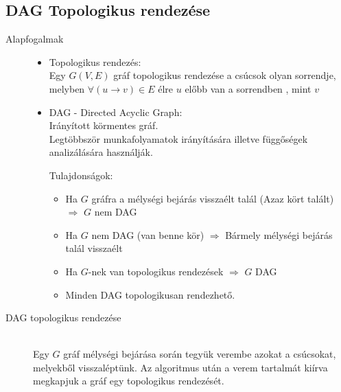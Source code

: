 \documentclass[margin=0px]{article}
\begin{document}
\subsection{DAG Topologikus rendezése}
\begin{description}
    \item[Alapfogalmak] \hfill
        \begin{itemize}
            \item Topologikus rendezés: \\
                  Egy $G(V,E)$ gráf topologikus rendezése a csúcsok olyan sorrendje, melyben $\forall (u\rightarrow v) \in E$ élre $u$ előbb van a sorrendben , mint $v$
            \item DAG - Directed Acyclic Graph: \\
                  Irányított körmentes gráf. \\
                  Legtöbbször munkafolyamatok irányítására illetve függőségek analizálására használják.

                  Tulajdonságok:
                  \begin{itemize}
                      \item Ha $G$ gráfra a mélységi bejárás visszaélt talál (Azaz kört talált) $\Longrightarrow$ $G$ nem DAG
                      \item Ha $G$ nem DAG (van benne kör) $\Longrightarrow$ Bármely mélységi bejárás talál visszaélt
                      \item Ha $G$-nek van topologikus rendezések $\Longrightarrow$ $G$ DAG
                      \item Minden DAG topologikusan rendezhető.
                  \end{itemize}
        \end{itemize}
    \item[DAG topologikus rendezése] \hfill \\
        Egy $G$ gráf mélységi bejárása során tegyük verembe azokat a csúcsokat, melyekből visszaléptünk. Az algoritmus után a verem tartalmát kiírva megkapjuk a gráf egy topologikus rendezését.
\end{description}
\end{document}
